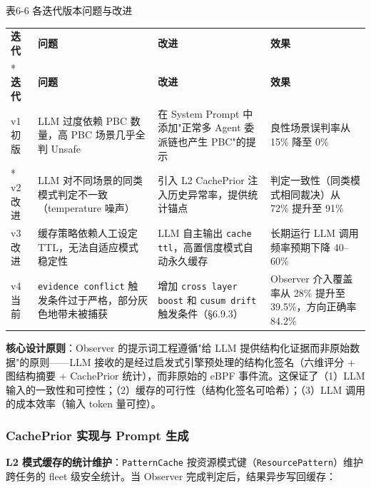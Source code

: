 \documentclass[a4paper]{ctexart}
\makeatletter
\renewcommand{\_}{%
  \ifmmode
    \nfss@text{\textunderscore}%
  \else
    \textunderscore\discretionary{}{}{}%
  \fi}
\makeatother
\begin{document}
\medskip
{\centering\small
表6-6 各迭代版本问题与改进\par
\vspace{3pt}
\setlength{\tabcolsep}{6pt}
\renewcommand{\arraystretch}{1.1}
\begin{longtable}{p{4.3cm} >{\raggedright\arraybackslash}p{3.3cm} >{\raggedright\arraybackslash}p{3.3cm} >{\raggedright\arraybackslash}p{3.3cm}}
\hline
\textbf{迭代} & \textbf{问题} & \textbf{改进} & \textbf{效果} \\*
\hline
\endfirsthead
\hline
\textbf{迭代} & \textbf{问题} & \textbf{改进} & \textbf{效果} \\
\hline
\endhead
\hline
\endfoot
\hline
\endlastfoot
v1 初版 & LLM 过度依赖 PBC 数量，高 PBC 场景几乎全判 Unsafe & 在 System Prompt 中添加"正常多 Agent 委派链也产生 PBC"的提示 & 良性场景误判率从 15\% 降至 0\% \\*
\hline
v2 改进 & LLM 对不同场景的同类模式判定不一致（temperature 噪声） & 引入 L2 CachePrior 注入历史异常率，提供统计锚点 & 判定一致性（同类模式相同裁决）从 72\% 提升至 91\% \\
\hline
v3 改进 & 缓存策略依赖人工设定 TTL，无法自适应模式稳定性 & LLM 自主输出 \texttt{cache\_ttl}，高置信度模式自动永久缓存 & 长期运行 LLM 调用频率预期下降 40--60\% \\
\hline
v4 当前 & \texttt{evidence\_conflict} 触发条件过于严格，部分灰色地带未被捕获 & 增加 \texttt{cross\_layer\_boost} 和 \texttt{cusum\_drift} 触发条件（§6.9.3） & Observer 介入覆盖率从 28\% 提升至 39.5\%，方向正确率 84.2\% \\
\hline
\end{longtable}
\par}


\textbf{核心设计原则}：Observer 的提示词工程遵循"给 LLM 提供结构化证据而非原始数据"的原则——LLM 接收的是经过启发式引擎预处理的结构化签名（六维评分 + 图结构摘要 + CachePrior 统计），而非原始的 eBPF 事件流。这保证了（1）LLM 输入的一致性和可控性；（2）缓存的可行性（结构化签名可哈希）；（3）LLM 调用的成本效率（输入 token 量可控）。


\subsubsection{CachePrior 实现与 Prompt 生成}



\textbf{L2 模式缓存的统计维护}：\texttt{PatternCache} 按资源模式键（\texttt{ResourcePattern}）维护跨任务的 fleet 级安全统计。当 Observer 完成判定后，结果异步写回缓存：
\end{document}
